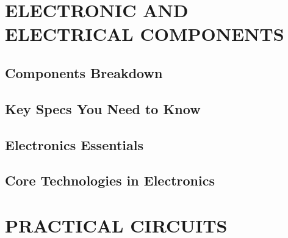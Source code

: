\documentclass[12pt]{book}
\begin{document}
\chapter{ELECTRONIC AND ELECTRICAL COMPONENTS}
\section{Components Breakdown}












\section{Key Specs You Need to Know}












\section{Electronics Essentials}












\section{Core Technologies in Electronics}











\chapter{PRACTICAL CIRCUITS}
\end{document}
